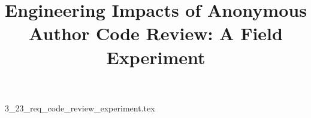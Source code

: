 \documentclass{article}      %
\title{Engineering Impacts of Anonymous Author Code Review: A Field Experiment}  %
\begin{document}

\maketitle                   %



{3_23_req_code_review_experiment.tex}
\printbibliography
\end{document}
